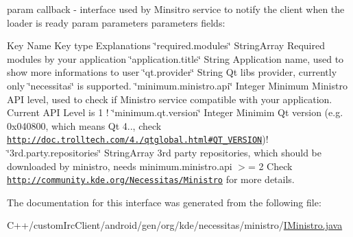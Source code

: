 param callback -\/ interface used by Minsitro service to notify the client when the loader is ready param parameters parameters fields\-:
\begin{DoxyItemize}
\item Key Name Key type Explanations \char`\"{}required.\-modules\char`\"{} String\-Array Required modules by your application \char`\"{}application.\-title\char`\"{} String Application name, used to show more informations to user \char`\"{}qt.\-provider\char`\"{} String Qt libs provider, currently only \char`\"{}necessitas\char`\"{} is supported. \char`\"{}minimum.\-ministro.\-api\char`\"{} Integer Minimum Ministro A\-P\-I level, used to check if Ministro service compatible with your application. Current A\-P\-I Level is 1 ! \char`\"{}minimum.\-qt.\-version\char`\"{} Integer Minimim Qt version (e.\-g. 0x040800, which means Qt 4.., check \href{http://doc.trolltech.com/4.8/qtglobal.html#QT_VERSION}{\tt http\-://doc.\-trolltech.\-com/4./qtglobal.\-html\#\-Q\-T\-\_\-\-V\-E\-R\-S\-I\-O\-N})! \char`\"{}3rd.\-party.\-repositories\char`\"{} String\-Array 3rd party repositories, which should be downloaded by ministro, needs minimum.\-ministro.\-api $>$= 2 Check \href{http://community.kde.org/Necessitas/Ministro}{\tt http\-://community.\-kde.\-org/\-Necessitas/\-Ministro} for more details. 
\end{DoxyItemize}

The documentation for this interface was generated from the following file\-:\begin{DoxyCompactItemize}
\item 
C++/custom\-Irc\-Client/android/gen/org/kde/necessitas/ministro/\hyperlink{_i_ministro_8java}{I\-Ministro.\-java}\end{DoxyCompactItemize}
